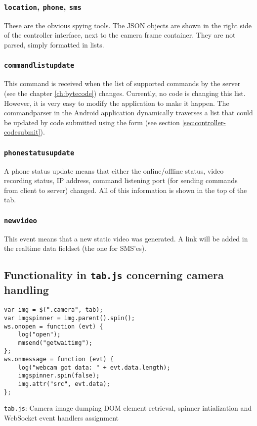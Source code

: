 \documentclass[a4paper]{report}
\newcommand{\filename}[1]{\texttt{#1}}
\begin{document}
{\subsubsection{\texttt{location}, \texttt{phone}, \texttt{sms}}
These are the obvious spying tools. The JSON objects are shown in the right side of the controller interface, next to the camera frame container. They are not parsed, simply formatted in lists.
\subsubsection{\texttt{commandlistupdate}}
This command is received when the list of supported commands by the server (see the chapter \ref{ch:bytecode}) changes. Currently, no code is changing this list. However, it is very easy to modify the application to make it happen. The commandparser in the Android application dynamically traverses a list that could be updated by code submitted using the form (see section \ref{sec:controller-codesubmit}).
\subsubsection{\texttt{phonestatusupdate}}
A phone status update means that either the online/offline status, video recording status, IP address, command listening port (for sending commands from client to server) changed. All of this information is shown in the top of the tab.
\subsubsection{\texttt{newvideo}}
This event means that a new static video was generated. A link will be added in the realtime data fieldset (the one for SMS'es).

\subsection{Functionality in \filename{tab.js} concerning camera handling}
\begin{listing}[H]
\begin{verbatim}
var img = $(".camera", tab);
var imgspinner = img.parent().spin();
ws.onopen = function (evt) {
	log("open");
	mmsend("getwaitimg");
};
ws.onmessage = function (evt) {
	log("webcam got data: " + evt.data.length);
	imgspinner.spin(false);
	img.attr("src", evt.data);
};
\end{verbatim}
\caption{\filename{tab.js}: Camera image dumping DOM element retrieval, spinner intialization and WebSocket event handlers assignment}
\label{lst:tabjsws}
\end{listing}

}
\end{document}
